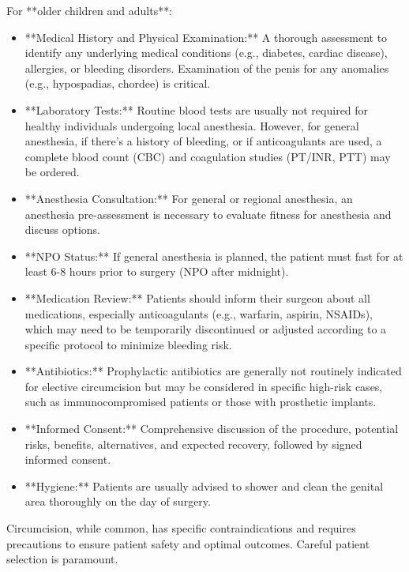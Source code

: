 For **older children and adults**:
\begin{itemize}
  \item **Medical History and Physical Examination:** A thorough assessment to identify any underlying medical conditions (e.g., diabetes, cardiac disease), allergies, or bleeding disorders. Examination of the penis for any anomalies (e.g., hypospadias, chordee) is critical.
  \item **Laboratory Tests:** Routine blood tests are usually not required for healthy individuals undergoing local anesthesia. However, for general anesthesia, if there's a history of bleeding, or if anticoagulants are used, a complete blood count (CBC) and coagulation studies (PT/INR, PTT) may be ordered.
  \item **Anesthesia Consultation:** For general or regional anesthesia, an anesthesia pre-assessment is necessary to evaluate fitness for anesthesia and discuss options.
  \item **NPO Status:** If general anesthesia is planned, the patient must fast for at least 6-8 hours prior to surgery (NPO after midnight).
  \item **Medication Review:** Patients should inform their surgeon about all medications, especially anticoagulants (e.g., warfarin, aspirin, NSAIDs), which may need to be temporarily discontinued or adjusted according to a specific protocol to minimize bleeding risk.
  \item **Antibiotics:** Prophylactic antibiotics are generally not routinely indicated for elective circumcision but may be considered in specific high-risk cases, such as immunocompromised patients or those with prosthetic implants.
  \item **Informed Consent:** Comprehensive discussion of the procedure, potential risks, benefits, alternatives, and expected recovery, followed by signed informed consent.
  \item **Hygiene:** Patients are usually advised to shower and clean the genital area thoroughly on the day of surgery.
\end{itemize}

Circumcision, while common, has specific contraindications and requires precautions to ensure patient safety and optimal outcomes. Careful patient selection is paramount.

